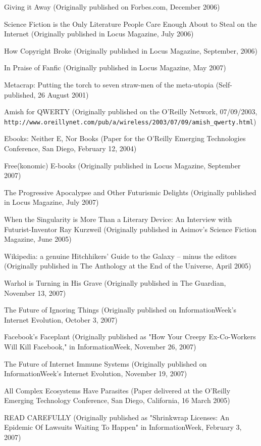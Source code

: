 Giving it Away (Originally published on Forbes.com, December 2006)

Science Fiction is the Only Literature People Care Enough About to
Steal on the Internet (Originally published in Locus Magazine, July
2006)

How Copyright Broke (Originally published in Locus Magazine,
September, 2006)

In Praise of Fanfic (Originally published in Locus Magazine, May
2007)

Metacrap: Putting the torch to seven straw-men of the meta-utopia
(Self-published, 26 August 2001)

Amish for QWERTY (Originally published on the O'Reilly Network,
07/09/2003,
\texttt{http://www.oreillynet.com/pub/a/wireless/2003/07/09/amish\_qwerty.html})

Ebooks: Neither E, Nor Books (Paper for the O'Reilly Emerging
Technologies Conference, San Diego, February 12, 2004)

Free(konomic) E-books (Originally published in Locus Magazine,
September 2007)

The Progressive Apocalypse and Other Futurismic Delights
(Originally published in Locus Magazine, July 2007)

When the Singularity is More Than a Literary Device: An Interview
with Futurist-Inventor Ray Kurzweil (Originally published in
Asimov's Science Fiction Magazine, June 2005)

Wikipedia: a genuine Hitchhikers' Guide to the Galaxy -- minus the
editors (Originally published in The Anthology at the End of the
Universe, April 2005)

Warhol is Turning in His Grave (Originally published in The
Guardian, November 13, 2007)

The Future of Ignoring Things (Originally published on
InformationWeek's Internet Evolution, October 3, 2007)

Facebook's Faceplant (Originally published as "How Your Creepy
Ex-Co-Workers Will Kill Facebook," in InformationWeek, November 26,
2007)

The Future of Internet Immune Systems (Originally published on
InformationWeek's Internet Evolution, November 19, 2007)

All Complex Ecosystems Have Parasites (Paper delivered at the
O'Reilly Emerging Technology Conference, San Diego, California, 16
March 2005)

READ CAREFULLY (Originally published as "Shrinkwrap Licenses: An
Epidemic Of Lawsuits Waiting To Happen" in InformationWeek,
February 3, 2007)

